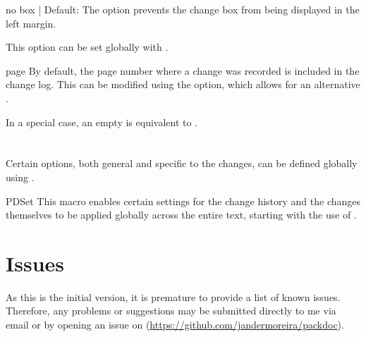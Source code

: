 \documentclass[11pt]{article}
\begin{document}
\begin{PDListing}
\end{PDListing}

\begin{Optiondef}{no box}{ | }{Default: }
    The  option prevents the change box from being displayed in the left margin.

    This option can be set globally with .
\end{Optiondef}

\begin{Optiondef}{page}{}{}
    By default, the page number where a change was recorded is included in the change log. This can be modified using the  option, which allows for an alternative .

    In a special case, an empty  is equivalent to .
\end{Optiondef}

\begin{PDListing}
\end{PDListing}


\section{}

Certain options, both general and specific to the changes, can be defined globally using .

\begin{Macrodef}{PDSet}{}{}
    This macro enables certain settings for the change history and the changes themselves to be applied globally across the entire text, starting with the use of .
\end{Macrodef}

\begin{PDListing}
\end{PDListing}


\section{Issues}

As this is the initial version, it is premature to provide a list of known issues. Therefore, any problems or suggestions may be submitted directly to me via email or by opening an issue on  (\url{https://github.com/jandermoreira/packdoc}).

\printindex
\end{document}

